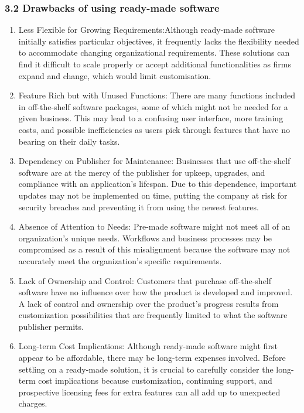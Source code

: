 \documentclass[letterpaper, 11pt]{report}
\begin{document}
\subsubsection*{3.2 Drawbacks of using ready-made software}
\begin{enumerate}
    \item Less Flexible for Growing Requirements:Although ready-made software initially satisfies particular objectives, it frequently lacks the flexibility needed to accommodate changing organizational requirements. These solutions can find it difficult to scale properly or accept additional functionalities as firms expand and change, which would limit customisation.

    \item Feature Rich but with Unused Functions: There are many functions included in off-the-shelf software packages, some of which might not be needed for a given business. This may lead to a confusing user interface, more training costs, and possible inefficiencies as users pick through features that have no bearing on their daily tasks.

    \item Dependency on Publisher for Maintenance: Businesses that use off-the-shelf software are at the mercy of the publisher for upkeep, upgrades, and compliance with an application's lifespan. Due to this dependence, important updates may not be implemented on time, putting the company at risk for security breaches and preventing it from using the newest features.

    \item Absence of Attention to Needs: Pre-made software might not meet all of an organization's unique needs. Workflows and business processes may be compromised as a result of this misalignment because the software may not accurately meet the organization's specific requirements.

    \item Lack of Ownership and Control: Customers that purchase off-the-shelf software have no influence over how the product is developed and improved. A lack of control and ownership over the product's progress results from customization possibilities that are frequently limited to what the software publisher permits.

    \item Long-term Cost Implications: Although ready-made software might first appear to be affordable, there may be long-term expenses involved. Before settling on a ready-made solution, it is crucial to carefully consider the long-term cost implications because customization, continuing support, and prospective licensing fees for extra features can all add up to unexpected charges.
    
\end{enumerate}
\end{document}
